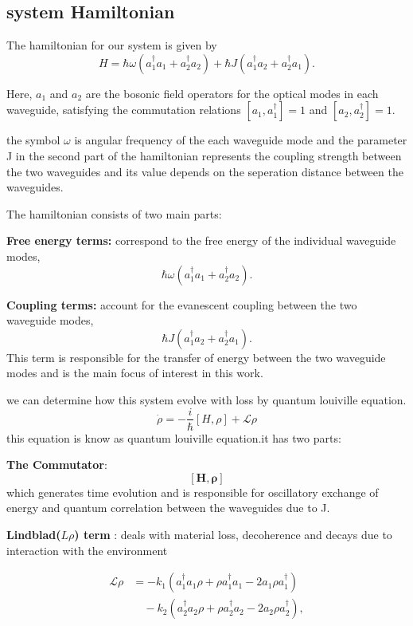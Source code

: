 \subsection{system Hamiltonian}
The hamiltonian for our system is given by
\begin{equation}
	H = \hbar \omega \left(a_1^{\dagger} a_1 + a_2^{\dagger} a_2\right)
	+ \hbar J \left(a_1^{\dagger} a_2 + a_2^{\dagger} a_1\right).
\end{equation}

Here, $a_1$ and $a_2$ are the bosonic field operators for the optical modes in each waveguide, satisfying the commutation relations
$[a_1, a_1^{\dagger}] = 1$ and $[a_2, a_2^{\dagger}] = 1$.

the symbol $\omega$ is angular frequency of the each waveguide mode and the parameter J in the second part of the hamiltonian represents the coupling strength between the two waveguides and its value depends on the seperation distance between the waveguides.

The hamiltonian consists of two main parts: 

\textbf{Free energy terms:} correspond to the free energy of the individual waveguide modes,
\[
\hbar \omega \left(a_1^{\dagger} a_1 + a_2^{\dagger} a_2\right).
\]

\textbf{Coupling terms:} account for the evanescent coupling between the two waveguide modes,
\[
\hbar J \left(a_1^{\dagger} a_2 + a_2^{\dagger} a_1\right).
\]
This term is responsible for the transfer of energy between the two waveguide modes and is the main focus of interest in this work.


we can determine how this system evolve with loss by quantum louiville equation.
\begin{equation}
	\dot{\rho} = -\frac{i}{\hbar}[H, \rho] + \mathcal{L}\rho
\end{equation}
this equation is know as quantum  louiville equation.it has two parts:

\textbf{The Commutator}:\[
\boldsymbol{[H,\rho]}
\]
which generates time evolution and is responsible for oscillatory exchange of energy and quantum correlation
between the waveguides due to J.


\textbf{Lindblad($L\rho$) term
}: deals with material loss, decoherence and decays due to interaction with the environment

\begin{align}
	\mathcal{L}\rho
	&= -k_1\left(a_1^\dagger a_1\rho + \rho a_1^\dagger a_1 - 2a_1\rho a_1^\dagger\right)
	\nonumber\\
	&\quad -k_2\left(a_2^\dagger a_2\rho + \rho a_2^\dagger a_2 - 2a_2\rho a_2^\dagger\right),
\end{align}

